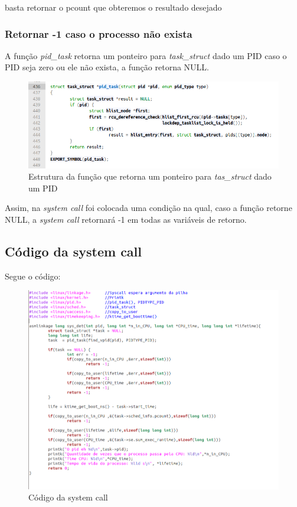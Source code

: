 \documentclass[12pt]{article}
\begin{document}
 	basta retornar o pcount que obteremos o resultado desejado
 \pagebreak
 
\subsubsection*{Retornar -1 caso o processo não exista}
A função \textit{pid\_task} retorna um ponteiro para \textit{task\_struct} dado um PID caso o PID seja zero ou ele não exista, a função retorna NULL\cite{getpid}.

\begin{figure}[!htb]
	\centering
\includegraphics[scale=0.5]{imagens/pid.png} 
	\caption{Estrutura da função que retorna um ponteiro para \textit{tas\_struct} dado um PID}
\end{figure}

Assim, na \textit{system call} foi colocada uma condição na qual, caso a função retorne NULL, a \textit{system call} retornará -1 em todas as variáveis de retorno.
\pagebreak
\subsection*{Código da system call}
	Segue o código:


\begin{figure}[!htb]
	\centering
\includegraphics[scale=0.5]{imagens/codigosys.png} 
	\caption{Código da system call}
\end{figure}
	
\end{document}
